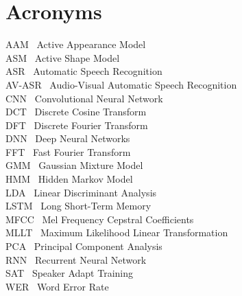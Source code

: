 \chapter*{\Large \center Acronyms}

AAM        \     Active Appearance Model\\
ASM        \     Active Shape Model\\
ASR        \     Automatic Speech Recognition \\
AV-ASR     \     Audio-Visual Automatic Speech Recognition\\
CNN        \ Convolutional Neural Network  \\
DCT       \  Discrete Cosine Transform\\
DFT      \   Discrete Fourier Transform \\
DNN       \  Deep Neural Networks \\
FFT      \   Fast Fourier Transform \\
GMM       \  Gaussian Mixture Model \\
HMM       \  Hidden Markov Model\\
LDA       \  Linear Discriminant Analysis\\
LSTM      \  Long Short-Term Memory\\
MFCC      \  Mel Frequency Cepstral Coefficients \\
MLLT      \  Maximum Likelihood Linear Transformation\\
PCA       \  Principal Component Analysis \\
RNN       \  Recurrent Neural Network\\
SAT       \  Speaker Adapt Training\\
WER       \  Word Error Rate \\

